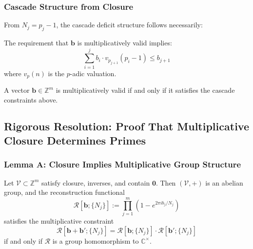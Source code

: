 \subsubsection{Cascade Structure from Closure}
\label{subsubsec:cascade-from-closure}

From $N_j = p_j - 1$, the cascade deficit structure follows necessarily:

\begin{definition}
The requirement that $\mathbf{b}$ is multiplicatively valid implies:
\begin{equation}
\label{eq:cascade-closure-condition}
\sum_{i=1}^j b_i \cdot v_{p_{j+1}}(p_i - 1) \leq b_{j+1}
\end{equation}
where $v_p(n)$ is the $p$-adic valuation.
\end{definition}

\begin{theorem}
\label{thm:cascade-necessity-sufficiency}
A vector $\mathbf{b} \in \mathbb{Z}^m$ is multiplicatively valid if and only if it satisfies the cascade constraints above.
\end{theorem}


\subsection{Rigorous Resolution: Proof That Multiplicative Closure Determines Primes}
\label{subsec:rigorous-closure-proof}

\subsubsection{Lemma A: Closure Implies Multiplicative Group Structure}
\label{subsubsec:lemma-a-closure-multiplicative}

\begin{lemma}
\label{lem:closure-group-structure}
Let $\mathcal{V} \subset \mathbb{Z}^m$ satisfy closure, inverses, and contain $\mathbf{0}$. Then $(\mathcal{V}, +)$ is an abelian group, and the reconstruction functional
\begin{equation}
\mathcal{R}[\mathbf{b}; \{N_j\}] := \prod_{j=1}^m \left(1 - e^{2\pi i b_j / N_j}\right)
\end{equation}
satisfies the multiplicative constraint
\begin{equation}
\label{eq:lem-a-multiplicative-constraint}
\mathcal{R}[\mathbf{b} + \mathbf{b}';\{N_j\}] = \mathcal{R}[\mathbf{b};\{N_j\}] \cdot \mathcal{R}[\mathbf{b}';\{N_j\}]
\end{equation}
if and only if $\mathcal{R}$ is a group homomorphism to $\mathbb{C}^\times$.
\end{lemma}

